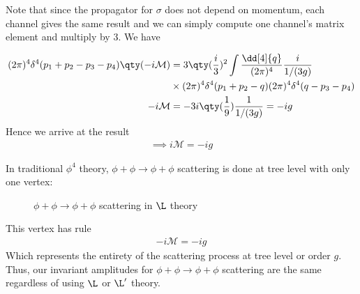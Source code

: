 \documentclass[12pt]{article}
\begin{document}
Note that since the propagator for $\sigma$ does not depend on momentum, each channel gives the same result and we can simply compute one channel's matrix element and multiply by 3. We have

\begin{align*}
  (2\pi)^4 \delta^4(p_1+p_2-p_3-p_4) \qty(- i \mathcal{M})&=3\qty(\frac{i}{3})^2\int \frac{\dd[4]{q}}{(2\pi)^4}
  \frac{i}{1/(3g)}\\&\times(2\pi)^4\delta ^4 (p_1+p_2-q) (2\pi )^4 \delta ^4 (q-p_3-p_4) \\
  -i\mathcal{M} &= -3 i\qty(\frac{1}{9}) \frac{1}{1/{(3g)}} = -i g
\end{align*}
Hence we arrive at the result
\begin{align}
  \implies \boxed{i\mathcal{M}= -i g}
\end{align}

In traditional $\phi^4$ theory, $\phi + \phi \rightarrow \phi + \phi$ scattering is done at tree level with only one vertex:
\begin{figure}[H]
  \centering
  \caption{$\phi + \phi\to \phi + \phi$ scattering in $\L$ theory}
  \label{fig:my_label}
\end{figure}
This vertex has rule 
\begin{align*}
  -i\mathcal{M} = -ig
\end{align*}
Which represents the entirety of the scattering process at tree level or order $g$. Thus, our invariant amplitudes for $\phi + \phi \rightarrow \phi +\phi$ scattering are the same regardless of using $\L$ or $\L ' $ theory.
\end{document}
